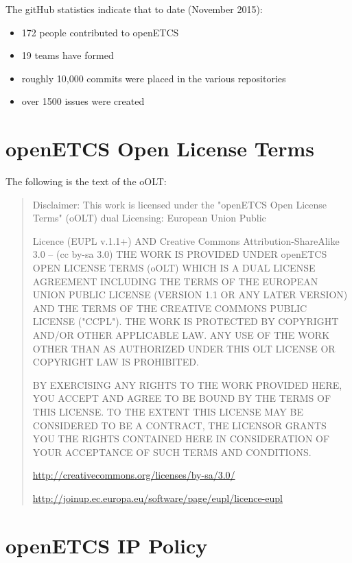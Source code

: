 \documentclass{template/openetcs_report}
\begin{document}
The gitHub statistics indicate that to date (November 2015):

\begin{itemize}
\item 172 people contributed to openETCS
\item 19 teams have formed
\item roughly 10,000 commits were placed in the various repositories
\item over 1500 issues were created
\end{itemize}

\appendix

\chapter{openETCS Open License Terms}
\label{sec:oOLT}

The following is the text of the oOLT:

\begin{quote}
Disclaimer: This work is licensed under the "openETCS Open License Terms" (oOLT) dual Licensing: European Union Public

Licence (EUPL v.1.1+) AND Creative Commons Attribution-ShareAlike 3.0 – (cc by-sa 3.0)
THE WORK IS PROVIDED UNDER openETCS OPEN LICENSE TERMS (oOLT) WHICH IS A DUAL LICENSE AGREEMENT INCLUDING THE TERMS OF THE EUROPEAN UNION PUBLIC LICENSE (VERSION 1.1 OR ANY LATER VERSION) AND THE
TERMS OF THE CREATIVE COMMONS PUBLIC LICENSE ("CCPL"). THE WORK IS PROTECTED BY COPYRIGHT AND/OR
OTHER APPLICABLE LAW. ANY USE OF THE WORK OTHER THAN AS AUTHORIZED UNDER THIS OLT LICENSE OR COPYRIGHT LAW IS PROHIBITED.

BY EXERCISING ANY RIGHTS TO THE WORK PROVIDED HERE, YOU ACCEPT AND AGREE TO BE BOUND BY THE TERMS
OF THIS LICENSE. TO THE EXTENT THIS LICENSE MAY BE CONSIDERED TO BE A CONTRACT, THE LICENSOR GRANTS
YOU THE RIGHTS CONTAINED HERE IN CONSIDERATION OF YOUR ACCEPTANCE OF SUCH TERMS AND CONDITIONS.

\url{http://creativecommons.org/licenses/by-sa/3.0/}

\url{http://joinup.ec.europa.eu/software/page/eupl/licence-eupl}

\end{quote}

\chapter{openETCS IP Policy}
\label{sec:ip-policy}
\end{document}
